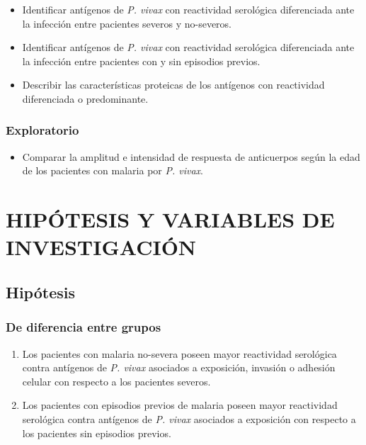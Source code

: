 \documentclass[a4paper]{article}
\providecommand{\tightlist}{%
  \setlength{\itemsep}{0pt}\setlength{\parskip}{0pt}}
\begin{document}
\begin{itemize}
\item
  Identificar antígenos de \emph{P. vivax} con reactividad serológica
  diferenciada ante la infección entre pacientes severos y no-severos.
\item
  Identificar antígenos de \emph{P. vivax} con reactividad serológica
  diferenciada ante la infección entre pacientes con y sin episodios
  previos.
\item
  Describir las características proteicas de los antígenos con
  reactividad diferenciada o predominante.
\end{itemize}

\subsubsection{Exploratorio}\label{exploratorio}

\begin{itemize}
\tightlist
\item
  Comparar la amplitud e intensidad de respuesta de anticuerpos según la
  edad de los pacientes con malaria por \emph{P. vivax}.
\end{itemize}

\section{HIPÓTESIS Y VARIABLES DE
INVESTIGACIÓN}\label{hipotesis-y-variables-de-investigacion}

\subsection{Hipótesis}\label{hipotesis}

\subsubsection{De diferencia entre
grupos}\label{de-diferencia-entre-grupos}

\begin{enumerate}
\def\labelenumi{\arabic{enumi}.}
\item
  Los pacientes con malaria no-severa poseen mayor reactividad
  serológica contra antígenos de \emph{P. vivax} asociados a exposición,
  invasión o adhesión celular con respecto a los pacientes severos.
\item
  Los pacientes con episodios previos de malaria poseen mayor
  reactividad serológica contra antígenos de \emph{P. vivax} asociados a
  exposición con respecto a los pacientes sin episodios previos.
\end{enumerate}
\end{document}
